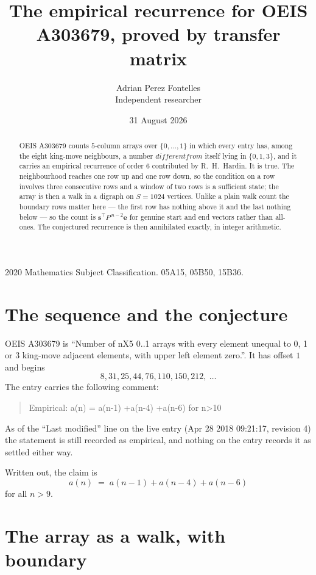 \documentclass[11pt,a4paper]{article}
\title{The empirical recurrence for OEIS A303679, proved by transfer matrix}
\author{Adrian Perez Fontelles\\ \small Independent researcher}
\date{31 August 2026}
\theoremstyle{plain}
\theoremstyle{definition}
\begin{document}
\maketitle

\begin{abstract}
OEIS A303679 counts $5$-column arrays over $\{0,\dots,1\}$ in which every entry has,
among the eight king-move neighbours, a number $different from$ itself lying in $\{0,1,3\}$, and it carries an empirical
recurrence of order $6$ contributed by R.~H.~Hardin. It is true. The neighbourhood
reaches one row up and one row down, so the condition on a row involves three consecutive
rows and a window of two rows is a sufficient state; the array is then a walk in a digraph
on $S=1024$ vertices. Unlike a plain walk count the boundary rows matter here --- the first
row has nothing above it and the last nothing below --- so the count is
$\mathbf{s}^{\!\top}P^{\,n-2}\mathbf{e}$ for genuine start and end vectors rather than
all-ones. The conjectured recurrence is then annihilated exactly, in integer arithmetic.
\end{abstract}

\noindent\small 2020 Mathematics Subject Classification. 05A15, 05B50, 15B36.\normalsize

\section{The sequence and the conjecture}

OEIS A303679 is ``Number of nX5 0..1 arrays with every element unequal to 0, 1 or 3 king-move adjacent elements, with upper left element zero.''. It has offset
$1$ and begins
\[
8, 31, 25, 44, 76, 110, 150, 212,\ \dots
\]
The entry carries the following comment:
\begin{quote}\small
Empirical: a(n) = a(n-1) +a(n-4) +a(n-6) for n>10
\end{quote}
As of the ``Last modified'' line on the live entry (Apr 28 2018 09:21:17, revision
4) the statement is still recorded as empirical, and nothing on the entry
records it as settled either way.

Written out, the claim is
\begin{equation}\label{eq:conj}
a(n)\;=\;a(n-1) + a(n-4) + a(n-6)
\end{equation}
for all $n>9$.

\section{The array as a walk, with boundary}
\end{document}

